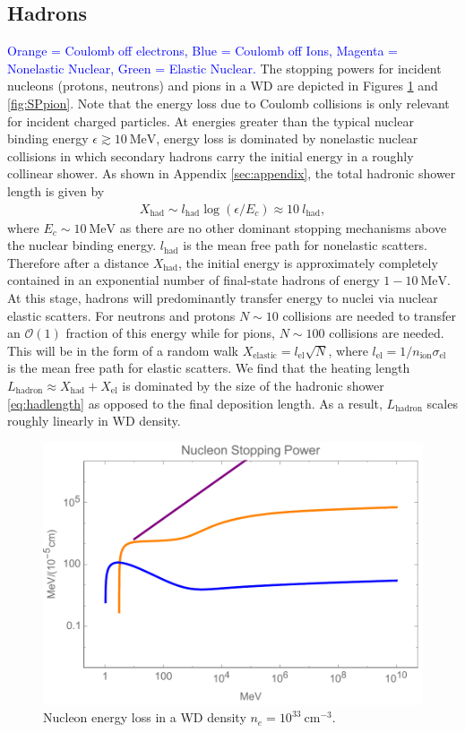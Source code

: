 \documentclass[twocolumn,showpacs,preprintnumbers,amsmath,amssymb,prd]{revtex4}
\newcommand{\OO}{\mathcal{O}}
\begin{document}
\subsection{Hadrons}
\textcolor{blue}{Orange = Coulomb off electrons, Blue = Coulomb off Ions, Magenta = Nonelastic Nuclear, Green = Elastic Nuclear.}
The stopping powers for incident nucleons (protons, neutrons) and pions in a WD are depicted in Figures \ref{fig:SPnuc} and \ref{fig:SPpion}.
Note that the energy loss due to Coulomb collisions is only relevant for incident charged particles.
At energies greater than the typical nuclear binding energy $\epsilon \gtrsim 10 ~\text{MeV}$, energy loss is dominated by nonelastic nuclear collisions in which secondary hadrons carry the initial energy in a roughly collinear shower.
As shown in Appendix \ref{sec:appendix}, the total hadronic shower length is given by
\begin{align}
\label{eq:hadlength}
X_{\text{had}} \sim l_\text{had} \log{(\epsilon/E_c)} \approx 10 ~l_\text{had},
\end{align}
where $E_c \sim 10 ~\text{MeV}$ as there are no other dominant stopping mechanisms above the nuclear binding energy.
$l_\text{had}$ is the mean free path for nonelastic scatters.
Therefore after a distance $X_\text{had}$, the initial energy is approximately completely contained in an exponential number of final-state hadrons of energy $1 - 10 ~\text{MeV}$.
At this stage, hadrons will predominantly transfer energy to nuclei via nuclear elastic scatters.
For neutrons and protons $N \sim 10$ collisions are needed to transfer an $\OO(1)$ fraction of this energy while for pions, $N \sim 100$ collisions are needed.
This will be in the form of a random walk $X_\text{elastic} = l_\text{el} \sqrt{N}$, where $ l_\text{el} = 1/n_\text{ion} \sigma_\text{el}$ is the mean free path for elastic scatters.
We find that the heating length $L_\text{hadron} \approx X_\text{had} + X_\text{el}$ is dominated by the size of the hadronic shower \eqref{eq:hadlength} as opposed to the final deposition length.
As a result, $L_\text{hadron}$ scales roughly linearly in WD density.


\begin{figure}
\includegraphics[scale=.45]{SPnucleon.pdf}
\caption{Nucleon energy loss in a WD density $n_e = 10^{33} ~\text{cm}^{-3}$.}
\label{fig:SPnuc}
\end{figure}
\end{document}
